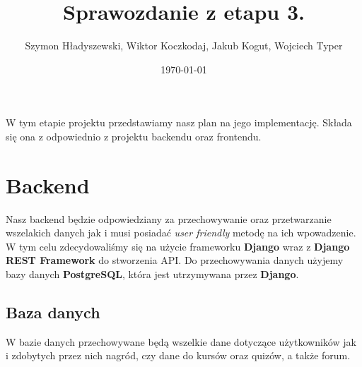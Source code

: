 \documentclass[11pt,a4paper]{article}
\title{Sprawozdanie z etapu 3.}
\author{Szymon Hładyszewski, Wiktor Koczkodaj, Jakub Kogut, Wojciech Typer}
\date{\today}
\numberwithin{equation}{section}
\begin{document}
\maketitle
W tym etapie projektu przedstawiamy nasz plan na jego implementację. Składa się ona z odpowiednio z projektu backendu oraz frontendu.
\section{Backend}
Nasz backend będzie odpowiedziany za przechowywanie oraz przetwarzanie wszelakich danych jak i musi posiadać \textit{user friendly} metodę na ich wpowadzenie. W tym celu zdecydowaliśmy się na użycie frameworku \textbf{Django} wraz z \textbf{Django REST Framework} do stworzenia API. Do przechowywania danych użyjemy bazy danych \textbf{PostgreSQL}, która jest utrzymywana przez \textbf{Django}.
\subsection{Baza danych}
W bazie danych przechowywane będą wszelkie dane dotyczące użytkowników jak i zdobytych przez nich nagród, czy dane do kursów oraz quizów, a także forum.
\end{document}
